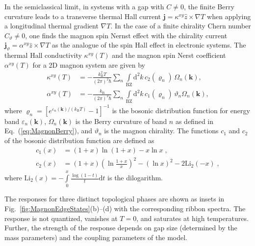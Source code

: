\documentclass[aps,preprintnumbers,amsmath,amssymb]{revtex4-2}
\begin{document}
In the semiclassical limit, in systems with a gap with $C\neq 0$, the finite Berry curvature leads to a transverse thermal Hall current $\mathbf{j} = \kappa^{xy} \hat{z}\times \nabla T$ when applying a longitudinal thermal gradient $\nabla T$. In the case of a finite chirality Chern number $C_\vartheta \neq 0$, one finds the magnon spin Nernst effect with the chirality current $\mathbf{j}_\vartheta = \alpha^{xy} \hat{z}\times \nabla T$ as the analogue of the spin Hall effect in electronic systems.
The thermal Hall conductivity $\kappa^{xy}(T)$ \cite{Matsumoto2011thermal} and the magnon spin Nerst coefficient $\alpha^{xy}(T)$ \cite{Cheng2016Nernst} for a 2D magnon system are given by
\begin{align}
    \kappa^{xy}(T) &= -\frac{k_\mathrm{B}^2 T}{(2\pi)^2 \hbar} \sum_n \int\limits_\mathrm{BZ} \mathrm{d}^2 k \, c_2(\varrho_n)\, \Omega_n (\mathbf{k}), \\
    \alpha^{xy}(T) &= -\frac{k_\mathrm{B}}{(2\pi)^2 \hbar} \sum_n \int\limits_\mathrm{BZ} \mathrm{d}^2 k \, c_1(\varrho_n)\, \vartheta_n \Omega_n (\mathbf{k}),
\end{align}
where $\varrho_n = [ e^{\varepsilon_n(\mathbf{k})/(k_\mathrm{B}T)} -1]^{-1}$ is the bosonic distribution function for energy band $\varepsilon_n(\mathbf{k})$, $\Omega_n(\mathbf{k})$ is the Berry curvature of band $n$ as defined in Eq.~(\ref{eq:MagnonBerry}), and $\vartheta_n$ is the magnon chirality. 
The functions $c_1$ and $c_2$ of the bosonic distribution function are defined as  
\begin{align*}
    c_1(x) &= (1+x)\ln (1+x) - x\ln x \; , \\
    c_2(x) &= (1+x)\left(\ln \frac{1+x}{x}\right)^2 - (\ln x)^2 - 2\mathrm{Li}_2(-x) \; , 
\end{align*}
where $\mathrm{Li}_2(x) = -\int\limits_0^x \frac{\log(1-t)}{t} \mathrm{d}t$ is the dilogarithm. 

The responses for three distinct topological phases are shown as insets in Fig.~\ref{fig:MagnonEdgeStates}(b)--(d) with the corresponding ribbon spectra. The response is not quantized, vanishes at $T=0$, and saturates at high temperatures. Further, the strength of the response depends on gap size (determined by the mass parameters) and the coupling parameters of the model.












%
\end{document}
